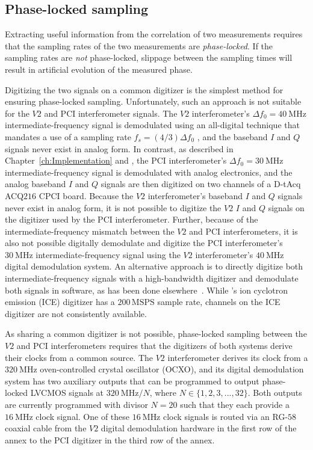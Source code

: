 \subsection{Phase-locked sampling}
\label{sec:ToroidalCorrelation:implementation_details_and_nonideal_effects:phase_locked_sampling}
Extracting useful information
from the correlation of two measurements
requires that the sampling rates of the two measurements
are \emph{phase-locked}.
If the sampling rates are \emph{not} phase-locked,
slippage between the sampling times
will result in artificial evolution of the measured phase.

Digitizing the two signals on a common digitizer
is the simplest method for ensuring phase-locked sampling.
Unfortunately, such an approach is not suitable
for the $V2$ and PCI interferometer signals.
The $V2$ interferometer's
$\Delta f_0 = \SI{40}{\mega\hertz}$ intermediate-frequency signal
is demodulated using an all-digital technique
that mandates a use of a sampling rate
$f_s = (4 / 3) \Delta f_0$
\cite{vanzeeland_rsi08}, and
the baseband $I$ and $Q$ signals never exist in analog form.
In contrast, as described in
Chapter~\ref{ch:Implementation} and \cite{davis_rsi16},
the PCI interferometer's
$\Delta f_0 = \SI{30}{\mega\hertz}$ intermediate-frequency signal
is demodulated with analog electronics, and
the analog baseband $I$ and $Q$ signals
are then digitized on two channels of a D-tAcq ACQ$216$ CPCI board.
Because the $V2$ interferometer's baseband $I$ and $Q$ signals
never exist in analog form,
it is not possible to digitize the $V2$ $I$ and $Q$ signals
on the digitizer used by the PCI interferometer.
Further, because of the intermediate-frequency mismatch
between the $V2$ and PCI interferometers,
it is also not possible digitally demodulate and digitize
the PCI interferometer's $\SI{30}{\mega\hertz}$ intermediate-frequency signal
using the $V2$ interferometer's
$\SI{40}{\mega\hertz}$ digital demodulation system.
An alternative approach is to directly digitize
both intermediate-frequency signals
with a high-bandwidth digitizer and
demodulate both signals in software,
as has been done elsewhere~\cite{mlynek_fst12}.
While \diiid's ion cyclotron emission (ICE) digitizer
has a $200 \, \text{MSPS}$ sample rate,
channels on the ICE digitizer are not consistently available.

As sharing a common digitizer is not possible,
phase-locked sampling between the $V2$ and PCI interferometers
requires that the digitizers of both systems
derive their clocks from a common source.
The $V2$ interferometer derives its clock
from a $\SI{320}{\mega\hertz}$ oven-controlled crystal oscillator (OCXO), and
its digital demodulation system
has two auxiliary outputs that can be programmed
to output phase-locked LVCMOS signals
at $\SI{320}{\mega\hertz} / N$, where
$N \in \{1, 2, 3, ..., 32\}$.
Both outputs are currently programmed with divisor $N = 20$
such that they each provide a $\SI{16}{\mega\hertz}$ clock signal.
One of these $\SI{16}{\mega\hertz}$ clock signals
is routed via an RG-$58$ coaxial cable
from the $V2$ digital demodulation hardware
in the first row of the \diiid\space annex
to the PCI digitizer
in the third row of the \diiid\space annex.

